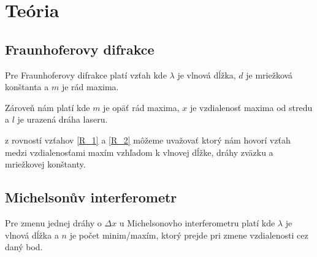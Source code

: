 \section{Teória}

\subsection{Fraunhoferovy difrakce}
Pre Fraunhoferovy difrakce platí vzťah
kde $\lambda$ je vlnová dĺžka, $d$ je mriežková konštanta a $m$ je rád maxima.

Zároveň nám platí 
kde $m$ je opäť rád maxima, $x$ je vzdialenosť maxima od stredu a $l$ je urazená dráha laseru.

z rovností vzťahov \ref{R_1} a \ref{R_2} môžeme uvažovať
ktorý nám hovorí vzťah medzi vzdialenosťami maxím vzhľadom k vlnovej dĺžke,  dráhy zväzku a mriežkovej konštanty.

\subsection{ Michelsonův interferometr}

Pre zmenu jednej dráhy o $\Delta x$ u Michelsonovho interferometru platí
kde $\lambda$ je vlnová dĺžka a $n$ je počet minim/maxím, ktorý prejde pri zmene vzdialenosti cez daný bod.



